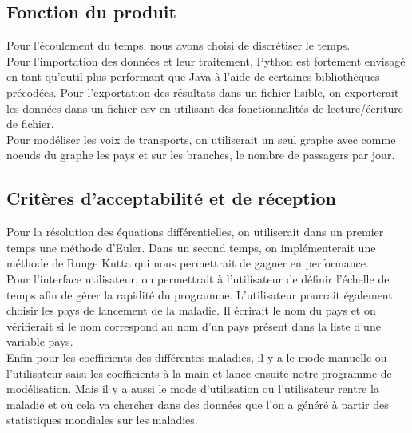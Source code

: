 \documentclass[12pt,a4paper]{report}
\begin{document}
\subsection*{Fonction du produit}
	\begin{flushleft}
	Pour l'écoulement du temps, nous avons choisi de discrétiser le temps. \\
	Pour l'importation des données et leur traitement, Python est fortement envisagé en tant qu'outil plus performant que Java à l'aide de certaines bibliothèques précodées.
	Pour l'exportation des résultats dans un fichier lisible, on exporterait les données dans un fichier csv en utilisant des fonctionnalités de lecture/écriture de fichier.\\
	Pour modéliser les voix de transports, on utiliserait un seul graphe avec comme noeuds du graphe les pays et sur les branches, le nombre de passagers par jour.
	\end{flushleft}

\subsection*{Critères d'acceptabilité et de réception}
\begin{flushleft}
	Pour la résolution des équations différentielles, on utiliserait dans un premier temps une méthode d'Euler. Dans un second temps, on implémenterait une méthode de Runge Kutta qui nous permettrait de gagner en performance. \\
	Pour l'interface utilisateur, on permettrait à l'utilisateur de définir l'échelle de temps afin de gérer la rapidité du programme. L'utilisateur pourrait également choisir les pays de lancement de la maladie. Il écrirait le nom du pays et on vérifierait si le nom correspond au nom d'un pays présent dans la liste d'une variable pays. \\
	Enfin pour les coefficients des différentes maladies, il y a le mode manuelle ou l'utilisateur saisi les coefficients à la main et lance ensuite notre programme de modélisation. Mais il y a aussi le mode d'utilisation ou l'utilisateur rentre la maladie et où cela va chercher dans des données que l'on a généré à partir des statistiques mondiales sur les maladies.
\end{flushleft}

\end{document}
